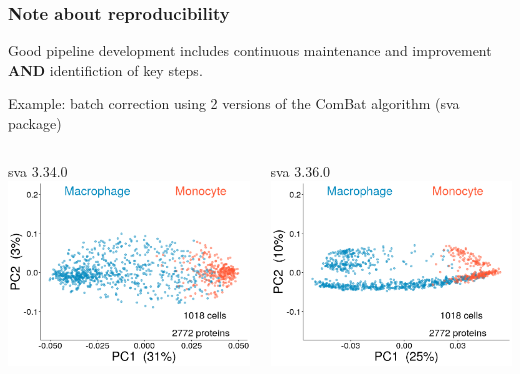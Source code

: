 \documentclass{beamer}
\newcommand{\hcode}[2][lgray]{{\ttfamily\color{vdgray}\colorbox{#1}{#2}}}
\newcommand{\frametitlesection}[1]{\frametitle{\centering #1 \footnotesize \hspace{0pt plus 1 filll} \insertsection}}
\begin{document}
\begin{frame}
\begin{columns}
\begin{column}{0.5\textwidth}
        \end{column}
    \end{columns}
\end{frame}

\begin{frame}
    \frametitlesection{Note about reproducibility}

    \small

    Good pipeline development includes continuous maintenance and
    improvement \textbf{AND} identifiction of key steps.

    \bigskip

    Example: batch correction using 2 versions of the \hcode{ComBat}
    algorithm (\hcode{sva} package)

    \bigskip

    \begin{columns}
        \scriptsize
        \centering
        \begin{column}{0.5\textwidth}
            \hcode{sva 3.34.0}
            \includegraphics[width=\textwidth]{figs/CombatOld.png}
        \end{column}
        \begin{column}{0.5\textwidth}
            \hcode{sva 3.36.0}
            \includegraphics[width=\textwidth]{figs/CombatNew.png}

\end{column}
\end{columns}
\end{frame}
\end{document}
